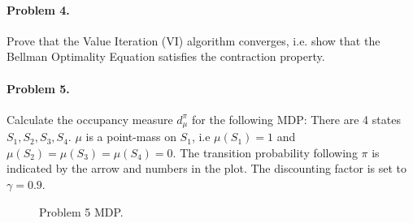 \documentclass{article}
\begin{document}
\paragraph{Problem 4.} Prove that the Value Iteration (VI) algorithm converges, i.e. show that the Bellman Optimality Equation satisfies the contraction property.

\paragraph{Problem 5.} Calculate the occupancy measure $d^\pi_\mu$ for the following MDP: There are 4 states $S_1,S_2,S_3,S_4$. $\mu$ is a point-mass on $S_1$, i.e $\mu(S_1)=1$ and $\mu(S_2)=\mu(S_3)=\mu(S_4)=0$. The transition probability following $\pi$ is indicated by the arrow and numbers in the plot. The discounting factor is set to $\gamma=0.9$.

\begin{figure}[!h]
\centering
{}
\caption{Problem 5 MDP.}
\end{figure}
\end{document}
